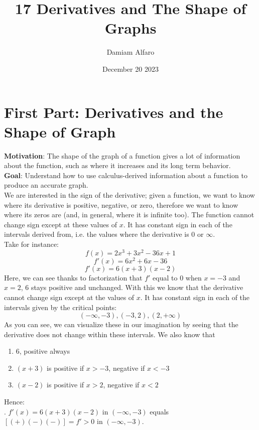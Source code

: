 \documentclass[12pt, letterpaper]{article}
\title{17 Derivatives and The Shape of Graphs}
\author{Damiam Alfaro}
\date{December 20 2023}
\begin{document}
\maketitle

\section{First Part: Derivatives and the Shape of Graph}
\textbf{Motivation}: The shape of the graph of a function gives a lot of information about the function, such as where it increases and its long term behavior.\\
\newline
\textbf{Goal}: Understand how to use calculus-derived information about a function to produce an accurate graph.\\
\newline
We are interested in the sign of the derivative; given a function, we want to know where its derivative is positive, negative, or zero, therefore we want to know where its zeros are (and, in general, where it is infinite too). The function cannot change sign except at these values of \(x\). It has constant sign in each of the intervals derived from, i.e. the values where the derivative is \(0\) or \(\infty\).\\
\newline
Take for instance:
\[f(x)=2x^3+3x^2-36x+1\]
\[f'(x)=6x^2+6x-36\]
\[f'(x)=6(x+3)(x-2)\]
Here, we can see thanks to factorization that \(f'\) equal to \(0\) when \(x=-3\) and \(x=2\), \(6\) stays positive and unchanged. With this we know that the derivative cannot change sign except at the values of \(x\). It has constant sign in each of the intervals given by the critical points:
\[(-\infty,-3), (-3,2), (2,+\infty)\]
As you can see, we can visualize these in our imagination by seeing that the derivative does not change within these intervals. We also know that
\begin{enumerate}
    \item \(6\), positive always
    \item \((x+3)\) is positive if \(x > -3\), negative if \(x < -3\)
    \item \((x-2)\) is positive if \(x > 2\), negative if \(x < 2\)
\end{enumerate}
Hence:\\
. \(f'(x)=6(x+3)(x-2)\) in \((-\infty,-3)\) equals \([(+)(-)(-)] = f' > 0\) in \((-\infty,-3)\).\\
\newline
\end{document}
